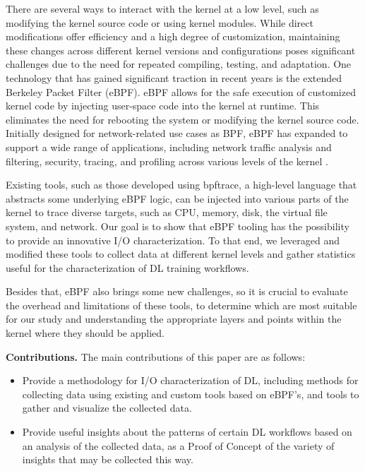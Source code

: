 \documentclass[conference]{IEEEtran}
\begin{document}
There are several ways to interact with the kernel at a low level, such as modifying the kernel source code or using kernel modules. While direct modifications offer efficiency and a high degree of customization, maintaining these changes across different kernel versions and configurations poses significant challenges due to the need for repeated compiling, testing, and adaptation. One technology that has gained significant traction in recent years is the extended Berkeley Packet Filter (eBPF).
eBPF allows for the safe execution of customized kernel code by injecting user-space code into the kernel at runtime.
This eliminates the need for rebooting the system or modifying the kernel source code.
Initially designed for network-related use cases as BPF, eBPF has expanded to support a wide range of applications, including network traffic analysis and filtering, security, tracing, and profiling across various levels of the kernel \cite{eBPFSurvey2}.

Existing tools, such as those developed using bpftrace, a high-level language that abstracts some underlying eBPF logic, can be injected into various parts of the kernel to trace diverse targets,
such as CPU, memory, disk, the virtual file system, and network.
Our goal is to show that eBPF tooling has the possibility to provide an innovative I/O characterization. To that end, we leveraged and modified these tools to collect data at different kernel levels and gather statistics useful for the characterization of DL training workflows.

Besides that, eBPF also brings some new challenges, so it is crucial to evaluate the overhead and limitations of these tools, to determine which are most suitable for our study and understanding the appropriate layers and points within the kernel where they should be applied.

\textbf{Contributions.} The main contributions of this paper are as follows:
\begin{itemize}
	\item Provide a methodology for I/O characterization of DL, including methods for collecting data using existing and custom tools based on eBPF's, and tools to gather and visualize the collected data.
	\item Provide useful insights about the patterns of certain DL workflows based on an analysis of the collected data, as a Proof of Concept of the variety of insights that may be collected this way.
\end{itemize}
\end{document}
